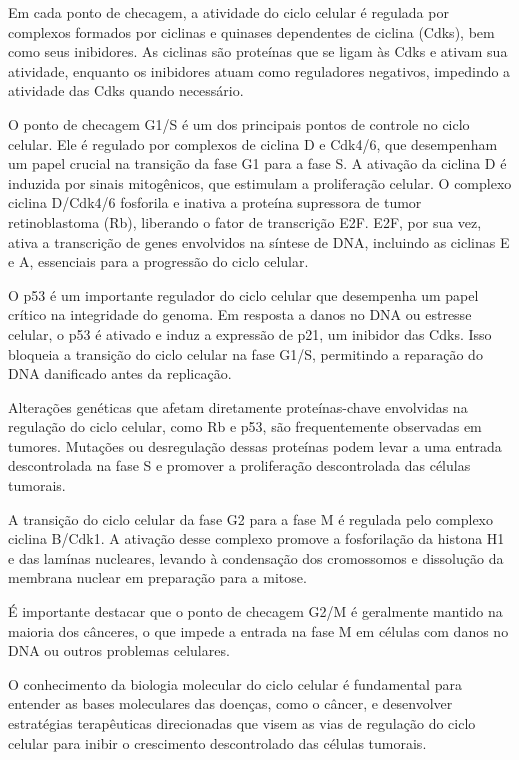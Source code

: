 \documentclass[11pt,a4paper]{article}
\begin{document}
	Em cada ponto de checagem, a atividade do ciclo celular é regulada por complexos formados por ciclinas e quinases dependentes de ciclina (Cdks), bem como seus inibidores. As ciclinas são proteínas que se ligam às Cdks e ativam sua atividade, enquanto os inibidores atuam como reguladores negativos, impedindo a atividade das Cdks quando necessário.

	O ponto de checagem G1/S é um dos principais pontos de controle no ciclo celular. Ele é regulado por complexos de ciclina D e Cdk4/6, que desempenham um papel crucial na transição da fase G1 para a fase S. A ativação da ciclina D é induzida por sinais mitogênicos, que estimulam a proliferação celular. O complexo ciclina D/Cdk4/6 fosforila e inativa a proteína supressora de tumor retinoblastoma (Rb), liberando o fator de transcrição E2F. E2F, por sua vez, ativa a transcrição de genes envolvidos na síntese de DNA, incluindo as ciclinas E e A, essenciais para a progressão do ciclo celular.

	O p53 é um importante regulador do ciclo celular que desempenha um papel crítico na integridade do genoma. Em resposta a danos no DNA ou estresse celular, o p53 é ativado e induz a expressão de p21, um inibidor das Cdks. Isso bloqueia a transição do ciclo celular na fase G1/S, permitindo a reparação do DNA danificado antes da replicação.

	Alterações genéticas que afetam diretamente proteínas-chave envolvidas na regulação do ciclo celular, como Rb e p53, são frequentemente observadas em tumores. Mutações ou desregulação dessas proteínas podem levar a uma entrada descontrolada na fase S e promover a proliferação descontrolada das células tumorais.

	A transição do ciclo celular da fase G2 para a fase M é regulada pelo complexo ciclina B/Cdk1. A ativação desse complexo promove a fosforilação da histona H1 e das lamínas nucleares, levando à condensação dos cromossomos e dissolução da membrana nuclear em preparação para a mitose.

	É importante destacar que o ponto de checagem G2/M é geralmente mantido na maioria dos cânceres, o que impede a entrada na fase M em células com danos no DNA ou outros problemas celulares.

	O conhecimento da biologia molecular do ciclo celular é fundamental para entender as bases moleculares das doenças, como o câncer, e desenvolver estratégias terapêuticas direcionadas que visem as vias de regulação do ciclo celular para inibir o crescimento descontrolado das células tumorais.
\end{document}
